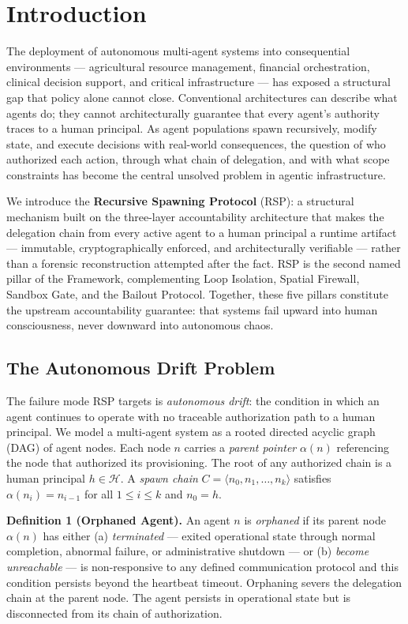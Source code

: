 \section{Introduction}
\label{sec:rs-intro}

The deployment of autonomous multi-agent systems into consequential environments — agricultural resource management, financial orchestration, clinical decision support, and critical infrastructure — has exposed a structural gap that policy alone cannot close. Conventional architectures can describe what agents do; they cannot architecturally guarantee that every agent's authority traces to a human principal. As agent populations spawn recursively, modify state, and execute decisions with real-world consequences, the question of who authorized each action, through what chain of delegation, and with what scope constraints has become the central unsolved problem in agentic infrastructure.

We introduce the \textbf{Recursive Spawning Protocol} (RSP): a structural mechanism built on the \bxthree{} three-layer accountability architecture that makes the delegation chain from every active agent to a human principal a runtime artifact — immutable, cryptographically enforced, and architecturally verifiable — rather than a forensic reconstruction attempted after the fact. RSP is the second named pillar of the \bxthree{} Framework, complementing Loop Isolation, Spatial Firewall, Sandbox Gate, and the Bailout Protocol. Together, these five pillars constitute the upstream accountability guarantee: that \bxthree{} systems fail upward into human consciousness, never downward into autonomous chaos.

\subsection{The Autonomous Drift Problem}

The failure mode RSP targets is \emph{autonomous drift}: the condition in which an agent continues to operate with no traceable authorization path to a human principal. We model a multi-agent system as a rooted directed acyclic graph (DAG) of agent nodes. Each node $n$ carries a \emph{parent pointer} $\alpha(n)$ referencing the node that authorized its provisioning. The root of any authorized chain is a human principal $h \in \mathcal{H}$. A \emph{spawn chain} $C = \langle n_0, n_1, \ldots, n_k \rangle$ satisfies $\alpha(n_i) = n_{i-1}$ for all $1 \leq i \leq k$ and $n_0 = h$.

\medskip
\noindent\textbf{Definition 1 (Orphaned Agent).} An agent $n$ is \emph{orphaned} if its parent node $\alpha(n)$ has either (a) \emph{terminated} — exited operational state through normal completion, abnormal failure, or administrative shutdown — or (b) \emph{become unreachable} — is non-responsive to any defined communication protocol and this condition persists beyond the heartbeat timeout. Orphaning severs the delegation chain at the parent node. The agent persists in operational state but is disconnected from its chain of authorization.

